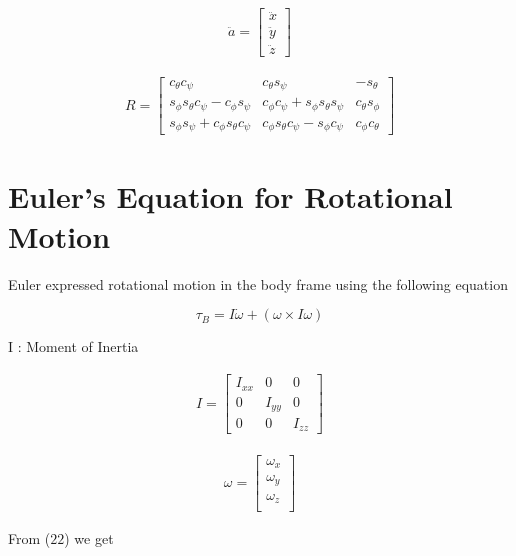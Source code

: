 \documentclass[9pt]{article}
\begin{document}
\begin{eqnarray}
\ddot{a} = 
\left[
\begin{matrix}
\ddot{x} \\
\ddot{y} \\
\ddot{z} 
\end{matrix}
\right]
\end{eqnarray}

\begin{eqnarray}
R =
\left[
\begin{matrix}
c_{\theta}c_{\psi} & c_{\theta}s_{\psi} & -s_{\theta}   \\
s_{\phi}s_{\theta}c_{\psi}-c_{\phi}s_{\psi} & c_{\phi}c_{\psi}+s_{\phi}s_{\theta}s_{\psi} & c_{\theta}s_{\phi}   \\
s_{\phi}s_{\psi}+c_{\phi}s_{\theta}c_{\psi} & c_{\phi}s_{\theta}c_{\psi}-s_{\phi}c_{\psi} & c_{\phi}c_{\theta}
\end{matrix}
\right]
\end{eqnarray}

\section{Euler's Equation for Rotational Motion}

Euler expressed rotational motion in the body frame using the following equation\cite{68291}

\begin{equation}
\tau_{B} = I\dot{\omega} + (\omega \times I\omega) 
\end{equation}

\noindent I : Moment of Inertia

\begin{eqnarray}
I =
\left[
\begin{matrix}
I_{xx} & 0 & 0 \\
0 & I_{yy} & 0 \\
0 & 0 & I_{zz}
\end{matrix}
\right]
\end{eqnarray}

\begin{eqnarray}
\omega = 
\left[
\begin{matrix}
\omega_{x} \\
\omega_{y} \\
\omega_{z} \\
\end{matrix}
\right]
\end{eqnarray}

\noindent From ($22$) we get
\end{document}

